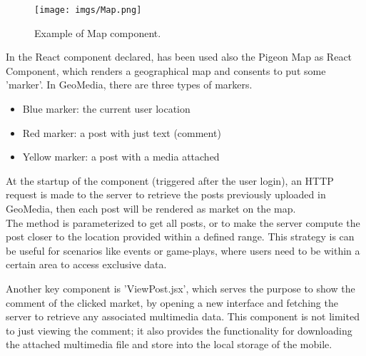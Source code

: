\documentclass[conference]{IEEEtran}
\begin{document}
\begin{figure}[htbp]
\begin{center}
{\texttt{[image: imgs/Map.png]}}
\end{center}
\caption{Example of Map component.}
\label{fig}
\end{figure}


In the React component declared, has been used also the Pigeon Map\cite{b8} as React Component, which renders a geographical map and consents to put some 'marker'.
In GeoMedia, there are three types of markers.
\begin{itemize}
\item Blue marker: the current user location
\item Red marker: a post with just text (comment)
\item Yellow marker: a post with a media attached 
\end{itemize}

At the startup of the component (triggered after the user login), an HTTP request is made to the server to retrieve the posts previously uploaded in GeoMedia, then each post will be rendered as market on the map.
\\
The method is parameterized to get all posts, or to make the server compute the post closer to the location provided within a defined range.
This strategy is can be useful for scenarios like events or game-plays, where users need to be  within a certain area to access exclusive data.


Another key component is 'ViewPost.jsx', which serves the purpose to show the comment of the clicked market, by opening a new interface and fetching the server to retrieve any associated multimedia data.
This component is not limited to just viewing the comment; it also provides the functionality for downloading the attached multimedia file and store into the local storage of the mobile.
\end{document}
